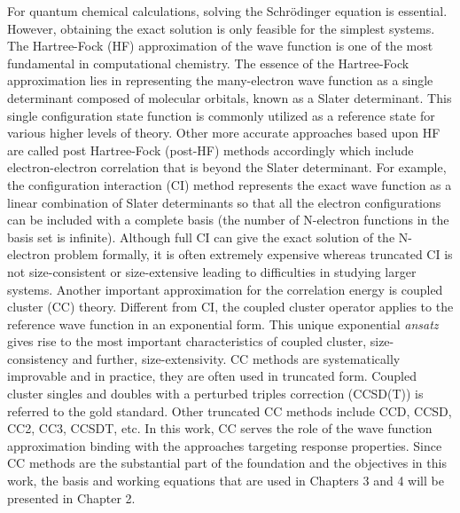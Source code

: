 For quantum chemical calculations, solving the Schr\"odinger equation is essential. However, obtaining the exact solution is only feasible for the simplest systems. The Hartree-Fock (HF)\cite{Slater1951, Szabo2012} approximation of the wave function is one of the most fundamental in computational chemistry. The essence of the Hartree-Fock approximation lies in representing the many-electron wave function as a single determinant composed of molecular orbitals, known as a Slater determinant. This single configuration state function is commonly utilized as a reference state for various higher levels of theory. Other more accurate approaches based upon HF are called post Hartree-Fock (post-HF) methods accordingly which include electron-electron correlation that is beyond the Slater determinant. For example, the configuration interaction (CI) method\cite{Sherrill1999} represents the exact wave function as a linear combination of Slater determinants so that all the electron configurations can be included with a complete basis (the number of N-electron functions in the basis set is infinite). Although full CI can give the exact solution of the N-electron problem formally, it is often extremely expensive whereas truncated CI is not size-consistent or size-extensive leading to difficulties in studying larger systems. Another important approximation for the correlation energy is coupled cluster (CC) theory.\cite{Crawford2000} Different from CI, the coupled cluster operator applies to the reference wave function in an exponential form. This unique exponential \textit{ansatz} gives rise to the most important characteristics of coupled cluster, size-consistency and further, size-extensivity. CC methods are systematically improvable and in practice, they are often used in truncated form. Coupled cluster singles and doubles with a perturbed triples correction (CCSD(T))\cite{Purvis1982} is referred to the gold standard. Other truncated CC methods include CCD, CCSD, CC2,\cite{Christiansen1995} CC3,\cite{Koch1997} CCSDT, etc. In this work, CC serves the role of the wave function approximation binding with the approaches targeting response properties. Since CC methods are the substantial part of the foundation and the objectives in this work, the basis and working equations that are used in Chapters 3 and 4 will be presented in Chapter 2. 

